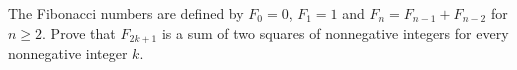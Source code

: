 The Fibonacci numbers are defined by $F_0=0$, $F_1=1$ and $F_n=F_{n-1}+F_{n-2}$ for $n\ge2$. Prove that $F_{2k+1}$ is a sum of two squares of nonnegative integers for every nonnegative integer $k$.
